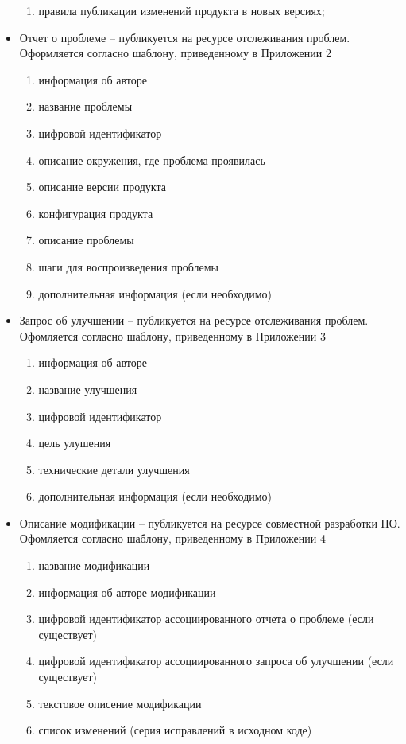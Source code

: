 \begin{itemize}
\begin{enumerate}
        \item правила публикации изменений продукта в новых версиях;
    \end{enumerate}

    \item Отчет о проблеме -- публикуется на ресурсе отслеживания проблем.
    Оформляется согласно шаблону, приведенному в Приложении 2
    \begin{enumerate}
        \item информация об авторе
        \item название проблемы
        \item цифровой идентификатор
        \item описание окружения, где проблема проявилась
        \item описание версии продукта
        \item конфигурация продукта
        \item описание проблемы
        \item шаги для воспроизведения проблемы
        \item дополнительная информация (если необходимо)
    \end{enumerate}

    \item Запрос об улучшении -- публикуется на ресурсе отслеживания проблем.
    Офомляется согласно шаблону, приведенному в Приложении 3
    \begin{enumerate}
        \item информация об авторе
        \item название улучшения
        \item цифровой идентификатор
        \item цель улушения
        \item технические детали улучшения
        \item дополнительная информация (если необходимо)
    \end{enumerate}

    \item Описание модификации -- публикуется на ресурсе совместной разработки ПО.
    Офомляется согласно шаблону, приведенному в Приложении 4
    \begin{enumerate}
        \item название модификации
        \item информация об авторе модификации
        \item цифровой идентификатор ассоциированного отчета о проблеме (если существует)
        \item цифровой идентификатор ассоциированного запроса об улучшении (если существует)
        \item текстовое описение модификации
        \item список изменений (серия исправлений в исходном коде)
    \end{enumerate}



\end{itemize}
